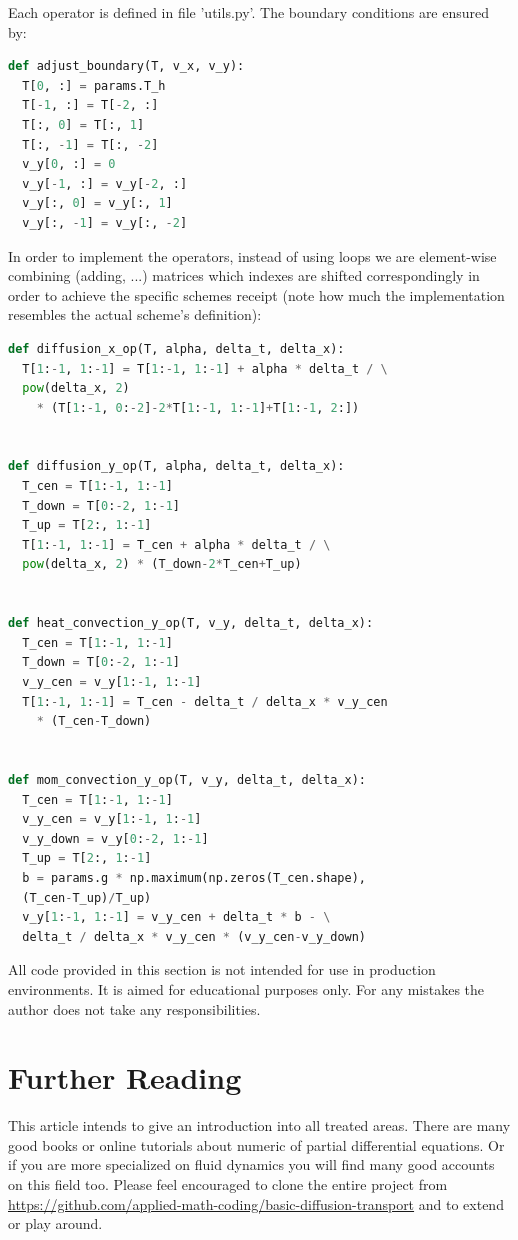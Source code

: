 \documentclass[]{article}
\begin{document}
Each operator is defined in file 'utils.py'.
The boundary conditions are ensured by:
\begin{lstlisting}[language=Python]
def adjust_boundary(T, v_x, v_y):
  T[0, :] = params.T_h
  T[-1, :] = T[-2, :]
  T[:, 0] = T[:, 1]
  T[:, -1] = T[:, -2]
  v_y[0, :] = 0
  v_y[-1, :] = v_y[-2, :]
  v_y[:, 0] = v_y[:, 1]
  v_y[:, -1] = v_y[:, -2]
\end{lstlisting}

In order to implement the operators, instead of using loops we are element-wise combining (adding, ...) matrices which indexes are shifted correspondingly in order to achieve the 
specific schemes receipt (note how much the implementation resembles the actual scheme's definition):
\begin{lstlisting}[language=Python]
def diffusion_x_op(T, alpha, delta_t, delta_x):
  T[1:-1, 1:-1] = T[1:-1, 1:-1] + alpha * delta_t / \
  pow(delta_x, 2)
    * (T[1:-1, 0:-2]-2*T[1:-1, 1:-1]+T[1:-1, 2:])


def diffusion_y_op(T, alpha, delta_t, delta_x):
  T_cen = T[1:-1, 1:-1]
  T_down = T[0:-2, 1:-1]
  T_up = T[2:, 1:-1]
  T[1:-1, 1:-1] = T_cen + alpha * delta_t / \
  pow(delta_x, 2) * (T_down-2*T_cen+T_up)


def heat_convection_y_op(T, v_y, delta_t, delta_x):
  T_cen = T[1:-1, 1:-1]
  T_down = T[0:-2, 1:-1]
  v_y_cen = v_y[1:-1, 1:-1]
  T[1:-1, 1:-1] = T_cen - delta_t / delta_x * v_y_cen
    * (T_cen-T_down)


def mom_convection_y_op(T, v_y, delta_t, delta_x):
  T_cen = T[1:-1, 1:-1]
  v_y_cen = v_y[1:-1, 1:-1]
  v_y_down = v_y[0:-2, 1:-1]
  T_up = T[2:, 1:-1]
  b = params.g * np.maximum(np.zeros(T_cen.shape),
  (T_cen-T_up)/T_up)
  v_y[1:-1, 1:-1] = v_y_cen + delta_t * b - \
  delta_t / delta_x * v_y_cen * (v_y_cen-v_y_down)
\end{lstlisting}
\noindent
All code provided in this section is not intended for use in production environments. It is aimed for educational purposes only. For any mistakes the author does not take any responsibilities.

\section{Further Reading}
This article intends to give an introduction into all treated areas.
There are many good books or online tutorials about numeric of partial
differential equations. Or if you are more specialized on fluid dynamics you will find
many good accounts on this field too. Please feel encouraged to clone the entire project from
\url{https://github.com/applied-math-coding/basic-diffusion-transport} and to extend or play around.
\end{document}
